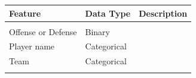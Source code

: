 \documentclass[]{article}
\begin{document}
\begin{longtable}[]{@{}lll@{}}
\toprule
\begin{minipage}[b]{0.32\columnwidth}\raggedright
Feature\strut
\end{minipage} & \begin{minipage}[b]{0.12\columnwidth}\raggedright
Data Type\strut
\end{minipage} & \begin{minipage}[b]{0.47\columnwidth}\raggedright
Description\strut
\end{minipage}\tabularnewline
\midrule
\endhead
\begin{minipage}[t]{0.32\columnwidth}\raggedright
\strut
\end{minipage} & \begin{minipage}[t]{0.12\columnwidth}\raggedright
\strut
\end{minipage} & \begin{minipage}[t]{0.47\columnwidth}\raggedright
\strut
\end{minipage}\tabularnewline
\begin{minipage}[t]{0.32\columnwidth}\raggedright
Offense or Defense\strut
\end{minipage} & \begin{minipage}[t]{0.12\columnwidth}\raggedright
Binary\strut
\end{minipage} & \begin{minipage}[t]{0.47\columnwidth}\raggedright
\strut
\end{minipage}\tabularnewline
\begin{minipage}[t]{0.32\columnwidth}\raggedright
Player name\strut
\end{minipage} & \begin{minipage}[t]{0.12\columnwidth}\raggedright
Categorical\strut
\end{minipage} & \begin{minipage}[t]{0.47\columnwidth}\raggedright
\strut
\end{minipage}\tabularnewline
\begin{minipage}[t]{0.32\columnwidth}\raggedright
Team\strut
\end{minipage} & \begin{minipage}[t]{0.12\columnwidth}\raggedright
Categorical\strut
\end{minipage} & \begin{minipage}[t]{0.47\columnwidth}\raggedright
\strut
\end{minipage}\tabularnewline
\begin{minipage}[t]{0.32\columnwidth}\raggedright

\end{minipage}
\end{longtable}
\end{document}
